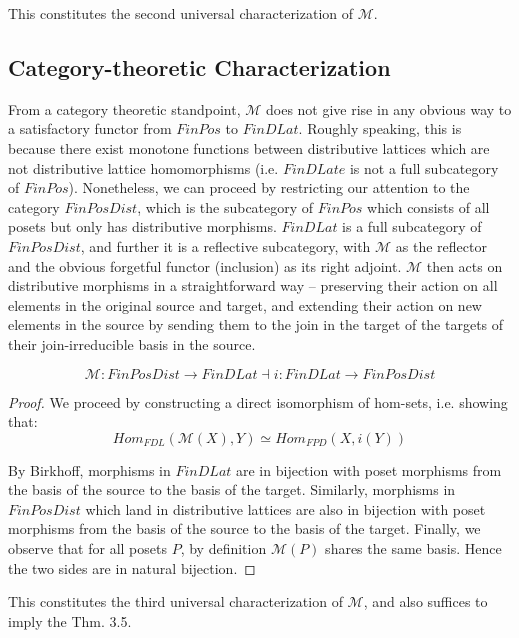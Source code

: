 \documentclass[hoptionsi,review,format=sigplan]{acmart}
\theoremstyle{definition}
\newcommand{\Mcc}{\mathcal{M}}
\begin{document}
This constitutes the second universal characterization of \(\Mcc\).

\subsection{Category-theoretic Characterization}

From a category theoretic standpoint, \(\Mcc\) does not give rise in any obvious way to a satisfactory functor from \(FinPos\) to \(FinDLat\). Roughly speaking, this is because there exist monotone functions between distributive lattices which are not distributive lattice homomorphisms (i.e. \(FinDLate\) is not a full subcategory of \(FinPos\)). Nonetheless, we can proceed by restricting our attention to the category \(FinPosDist\), which is the subcategory of \(FinPos\) which consists of all posets but only has distributive morphisms. \(FinDLat\) is a full subcategory of \(FinPosDist\), and further it is a reflective subcategory, with \(\Mcc\) as the reflector and the obvious forgetful functor (inclusion) as its right adjoint. \(\Mcc\) then acts on distributive morphisms in a straightforward way -- preserving their action on all elements in the original source and target, and extending their action on new elements in the source by sending them to the join in the target of the targets of their join-irreducible basis in the source.

\begin{theorem}
\begin{equation*}
\Mcc : FinPosDist \rightarrow FinDLat \allowbreak  \dashv \allowbreak i : FinDLat \rightarrow FinPosDist
\end{equation*}
\end{theorem}

\begin{proof}
We proceed by constructing a direct isomorphism of hom-sets, i.e. showing that:
\begin{equation*}
Hom_{FDL}(\Mcc(X),Y) \allowbreak \simeq \allowbreak Hom_{FPD}(X,i(Y))
\end{equation*}

By Birkhoff, morphisms in \(FinDLat\) are in bijection with poset morphisms from the basis of the source to the basis of the target. Similarly, morphisms in \(FinPosDist\) which land in distributive lattices are also in bijection with poset morphisms from the basis of the source to the basis of the target. Finally, we observe that for all posets \(P\), by definition \(\Mcc(P)\) shares the same basis. Hence the two sides are in natural bijection.
\end{proof}
This constitutes the third universal characterization of \(\Mcc\), and also suffices to imply the Thm. 3.5. 
\end{document}
